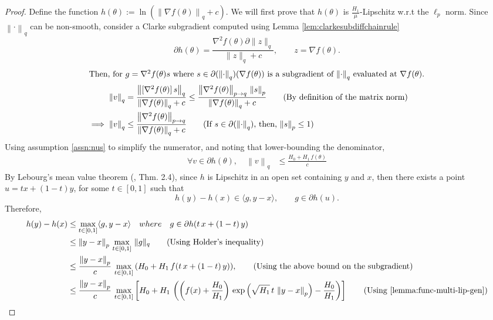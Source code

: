 \documentclass{article}
\newcommand{\norm}[1]{\left\|#1 \right\|}
\begin{document}
\begin{proof}
Define the function $h(\theta) := \ln(\norm{\nabla f(\theta)}_q  + c)$. We will first prove that $h(\theta)$ is $\frac{H_1}{\mu}$-Lipschitz w.r.t the $\ell_{p}$ norm. Since $\norm{\cdot}_q$ can be non-smooth, consider a Clarke subgradient computed using Lemma \ref{lem:clarkesubdiffchainrule}
\[
\partial h(\theta) = \frac{\nabla^2 f(\theta)  \partial \|z\|_q}{\|z\|_q+c}, \qquad z =  \nabla f(\theta).
\]
\begin{align*}
\intertext{Then, for $g = \nabla^2 f(\theta) s$ where $s \in \partial(\norm{\cdot}_q)(\nabla f(\theta))$ is a subgradient of $\norm{\cdot}_{q}$ evaluated at $\nabla f(\theta)$.}
\norm{v}_{q} &= \frac{\norm{[\nabla^2 f(\theta)] \, s}_q}{\norm{\nabla f(\theta)}_q + c} \leq \frac{\norm{\nabla^2 f(\theta)}_{p \to q} \, \norm{s}_{p}}{\norm{\nabla f(\theta)}_q + c} \tag{By definition of the matrix norm} \\
\implies \norm{v}_{q} & \leq \frac{\norm{\nabla^2 f(\theta)}_{p \to q}}{\norm{\nabla f(\theta)}_q + c} \tag{If $s \in \partial(\norm{\cdot}_q)$, then, $\norm{s}_p \leq 1$} \\
\end{align*}
Using assumption \ref{assn:nus} to simplify the numerator, and noting that lower-bounding the denominator, 
\begin{align*}
\forall v \in \partial{h}(\theta), \quad \norm{v}_q & \leq \frac{H_0 + H_1 \, f(\theta)}{c}    
\end{align*}
By Lebourg's mean value theorem (\cite{clarke1998nonsmooth}, Thm. 2.4), since $h$ is Lipschitz in an open set containing $y$ and $x$, then there exists a point $u = tx+(1-t)y$, for some $t\in[0,1]$ such that 
\[
h(y)-h(x)\in \langle g,y-x\rangle, \qquad g\in \partial h(u).
\]
Therefore,
\begin{align*}
h(y) - h(x) &\leq \max_{t\in[0,1]}  \langle g,y-x\rangle \quad {where} \quad g \in \partial h(t \, x + (1-t) \, y) \\
& \leq \norm{y - x}_p \, \max_{t\in[0,1]}\,\|g\|_q
 \tag{Using Holder's inequality} \\
& \leq \frac{\norm{y - x}_p}{c} \, \max_{t\in[0,1]} \, (H_0 + H_1 \, f(t \, x + (1-t) \, y)),  \tag{Using the above bound on the subgradient} \\
& \leq \frac{\norm{y - x}_p}{c} \,\max_{t\in[0,1]}  \left[H_0 + H_1 \, \left( \left(f(x) + \frac{H_0}{H_1} \right) \, \exp\left(\sqrt{H_1} \, t \, \norm{y - x}_p \right) - \frac{H_0}{H_1}\right) \right]  \tag{Using~\cref{lemma:func-multi-lip-gen}} \\

\end{align*}
\end{proof}
\end{document}
